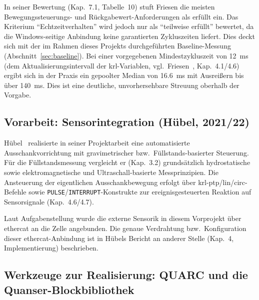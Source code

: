 In seiner Bewertung (Kap.~7.1, Tabelle~10) stuft Friesen die meisten
Bewegungssteuerungs- und Rückgabewert-Anforderungen als erfüllt ein.
Das
Kriterium \enquote{Echtzeitverhalten} wird jedoch nur als
\enquote{teilweise erfüllt} bewertet, da die Windows-seitige Anbindung keine
garantierten Zykluszeiten liefert. Dies deckt sich mit der im Rahmen dieses
Projekts durchgeführten Baseline-Messung (Abschnitt~\ref{sec:baseline}).
Bei
einer vorgegebenen Mindestzykluszeit von \SI{12}{\milli\second} (dem
Aktualisierungsintervall der \ac{krl}-Variablen, vgl.\
Friesen~\cite{friesen2021}, Kap.~4.1/4.6) ergibt sich in der Praxis ein
gepoolter Median von \SI{16.6}{\milli\second} mit Ausreißern bis über
\SI{140}{\milli\second}.
Dies ist eine deutliche, unvorhersehbare Streuung
oberhalb der Vorgabe.

\subsection{Vorarbeit: Sensorintegration (Hübel, 2021/22)}
\label{sec:huebel}

Hübel~\cite{huebel2022} realisierte in seiner Projektarbeit eine
automatisierte Ausschankvorrichtung mit gravimetrischer bzw.\
Füllstands-basierter Steuerung. Für die Füllstandsmessung vergleicht er
(Kap.~3.2) grundsätzlich hydrostatische sowie elektromagnetische und
Ultraschall-basierte Messprinzipien. Die Ansteuerung der eigentlichen
Ausschankbewegung erfolgt über \ac{krl}-\ac{ptp}/\ac{lin}/\ac{circ}-Befehle
sowie \texttt{PULSE}/\texttt{INTERRUPT}-Konstrukte zur ereignisgesteuerten
Reaktion auf Sensorsignale (Kap.~4.6/4.7).

Laut Aufgabenstellung wurde die externe Sensorik in
diesem Vorprojekt über \ac{ethercat} an die Zelle angebunden. Die genaue
Verdrahtung bzw.\ Konfiguration dieser \ac{ethercat}-Anbindung ist in
Hübels Bericht an anderer Stelle (Kap.~4, Implementierung) beschrieben.

\subsection{Werkzeuge zur Realisierung: QUARC und die Quanser-Blockbibliothek}
\label{sec:quarc_bloecke}

